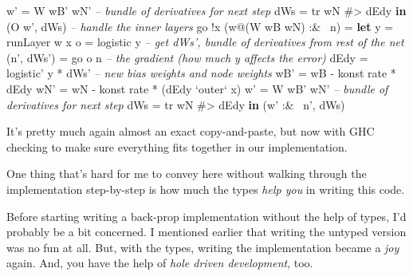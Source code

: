\documentclass[]{article}
\newenvironment{Shaded}{}{}
\newcommand{\KeywordTok}[1]{\textcolor[rgb]{0.00,0.44,0.13}{\textbf{{#1}}}}
\newcommand{\DataTypeTok}[1]{\textcolor[rgb]{0.56,0.13,0.00}{{#1}}}
\newcommand{\CommentTok}[1]{\textcolor[rgb]{0.38,0.63,0.69}{\textit{{#1}}}}
\newcommand{\OtherTok}[1]{\textcolor[rgb]{0.00,0.44,0.13}{{#1}}}
\newcommand{\FunctionTok}[1]{\textcolor[rgb]{0.02,0.16,0.49}{{#1}}}
\newcommand{\NormalTok}[1]{{#1}}
\begin{document}
\begin{Shaded}
\begin{Highlighting}[]
              \NormalTok{w'   }\FunctionTok{=} \DataTypeTok{W} \NormalTok{wB' wN'}
              \CommentTok{-- bundle of derivatives for next step}
              \NormalTok{dWs  }\FunctionTok{=} \NormalTok{tr wN }\FunctionTok{#>} \NormalTok{dEdy}
          \KeywordTok{in}  \NormalTok{(}\DataTypeTok{O} \NormalTok{w', dWs)}
    \CommentTok{-- handle the inner layers}
    \NormalTok{go }\FunctionTok{!}\NormalTok{x (w}\FunctionTok{@}\NormalTok{(}\DataTypeTok{W} \NormalTok{wB wN) }\FunctionTok{:&~} \NormalTok{n)}
        \FunctionTok{=} \KeywordTok{let} \NormalTok{y          }\FunctionTok{=} \NormalTok{runLayer w x}
              \NormalTok{o          }\FunctionTok{=} \NormalTok{logistic y}
              \CommentTok{-- get dWs', bundle of derivatives from rest of the net}
              \NormalTok{(n', dWs') }\FunctionTok{=} \NormalTok{go o n}
              \CommentTok{-- the gradient (how much y affects the error)}
              \NormalTok{dEdy       }\FunctionTok{=} \NormalTok{logistic' y }\FunctionTok{*} \NormalTok{dWs'}
              \CommentTok{-- new bias weights and node weights}
              \NormalTok{wB'  }\FunctionTok{=} \NormalTok{wB }\FunctionTok{-} \NormalTok{konst rate }\FunctionTok{*} \NormalTok{dEdy}
              \NormalTok{wN'  }\FunctionTok{=} \NormalTok{wN }\FunctionTok{-} \NormalTok{konst rate }\FunctionTok{*} \NormalTok{(dEdy }\OtherTok{`outer`} \NormalTok{x)}
              \NormalTok{w'   }\FunctionTok{=} \DataTypeTok{W} \NormalTok{wB' wN'}
              \CommentTok{-- bundle of derivatives for next step}
              \NormalTok{dWs  }\FunctionTok{=} \NormalTok{tr wN }\FunctionTok{#>} \NormalTok{dEdy}
          \KeywordTok{in}  \NormalTok{(w' }\FunctionTok{:&~} \NormalTok{n', dWs)}
\end{Highlighting}
\end{Shaded}

It's pretty much again almost an exact copy-and-paste, but now with GHC
checking to make sure everything fits together in our implementation.

One thing that's hard for me to convey here without walking through the
implementation step-by-step is how much the types \emph{help you} in
writing this code.

Before starting writing a back-prop implementation without the help of
types, I'd probably be a bit concerned. I mentioned earlier that writing
the untyped version was no fun at all. But, with the types, writing the
implementation became a \emph{joy} again. And, you have the help of
\emph{hole driven development}, too.
\end{document}
